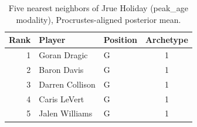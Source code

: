 \begin{table}[htbp]
  \centering\small
  \begin{tabular}{rllc}
    \toprule
    Rank & Player & Position & Archetype \\
    \midrule
    1 & Goran Dragic & G & 1 \\
    2 & Baron Davis & G & 1 \\
    3 & Darren Collison & G & 1 \\
    4 & Caris LeVert & G & 1 \\
    5 & Jalen Williams & G & 1 \\
    \bottomrule
  \end{tabular}
  \caption{Five nearest neighbors of Jrue Holiday (peak_age modality), Procrustes-aligned posterior mean.}
  \label{tab:Jrue_Holiday_neighbors_peak_age}
\end{table}


